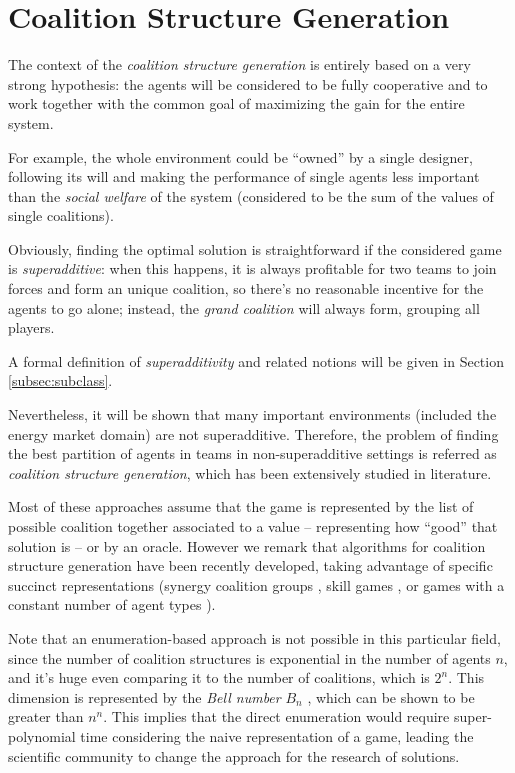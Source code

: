 \documentclass[11pt, twoside, titlepage, a4paper, openright]{report}
\begin{document}
\section{Coalition Structure Generation}

The context of the \textit{coalition structure generation} is entirely based on a very strong hypothesis: the agents will be considered to be fully cooperative and to work together with the common goal of maximizing the gain for the entire system.

For example, the whole environment could be ``owned'' by a single designer, following its will and making the performance of single agents less important than the \textit{social welfare} of the system (considered to be the sum of the values of single coalitions).

Obviously, finding the optimal solution is straightforward if the considered game is \textit{superadditive}: when this happens, it is always profitable for two teams to join forces and form an unique coalition, so there's no reasonable incentive for the agents to go alone; instead, the \textit{grand coalition} will always form, grouping all players. 

A formal definition of \textit{superadditivity} and related notions will be given in Section \ref{subsec:subclass}.

\noindent Nevertheless, it will be shown that many important environments (included the energy market domain) are not superadditive. Therefore, the problem of finding the best partition of agents in teams in non-superadditive settings is referred as \textit{coalition structure generation}, which has been extensively studied in literature.

Most of these approaches assume that the game is represented by the list of possible coalition together associated to a value -- representing how ``good'' that solution is -- or by an oracle. However we remark that algorithms for coalition structure generation have been recently developed, taking advantage of specific succinct representations (synergy coalition groups \cite{DBLP:conf/cp/OhtaCISIY09}, skill games \cite{DBLP:conf/aaai/BachrachMJK10}, or games with a constant number of agent types \cite{aziz}).

Note that an enumeration-based approach is not possible in this particular field, since the number of coalition structures is exponential in the number of agents $n$, and it's huge even comparing it to the number of coalitions, which is $2^n$. This dimension is represented by the \textit{Bell number} $B_n$ \cite{Bell:1934:en}, which can be shown to be greater than $n^n$. 
This implies that the direct enumeration would require super-polynomial time considering the naive representation of a game, leading the scientific community to change the approach for the research of solutions.
\end{document}
